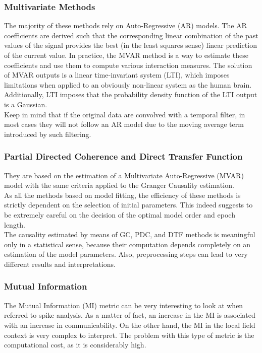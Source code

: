 \subsubsection{Multivariate Methods}
The majority of these methods rely on Auto-Regressive (AR) models. The AR coefficients are derived such that the corresponding linear combination of the past values
of the signal provides the best (in the least squares sense) linear prediction of the current value. In practice, the MVAR method is a way to estimate these coefficients
and use them to compute various interaction measures. The solution of MVAR outputs is a linear time-invariant system (LTI), which imposes limitations when applied to an
obviously non-linear system as the human brain. Additionally, LTI imposes that the probability density function of the LTI output is a Gaussian.\\
Keep in mind that if the original data are convolved with a temporal filter, in most cases they will not follow an AR model due to the moving average term introduced by
such filtering.
\subsubsection{Partial Directed Coherence and Direct Transfer Function}
They are based on the estimation of a Multivariate Auto-Regressive (MVAR) model with the same criteria applied to the Granger Causality estimation.\\
As all the methods based on model fitting, the efficiency of these methods is strictly dependent on the selection of initial parameters. This indeed suggests to be
extremely careful on the decision of the optimal model order and epoch length.\\
The causality estimated by means of GC, PDC, and DTF methods is meaningful only in a statistical sense, because their computation depends completely on an estimation
of the model parameters. Also, preprocessing steps can lead to very different results and interpretations.
\subsubsection{Mutual Information}
The Mutual Information (MI) metric can be very interesting to look at when referred to spike analysis. As a matter of fact, an increase in the MI is associated with an
increase in communicability. On the other hand, the MI in the local field context is very complex to interpret. The problem with this type of metric is the computational
cost, as it is considerably high.
